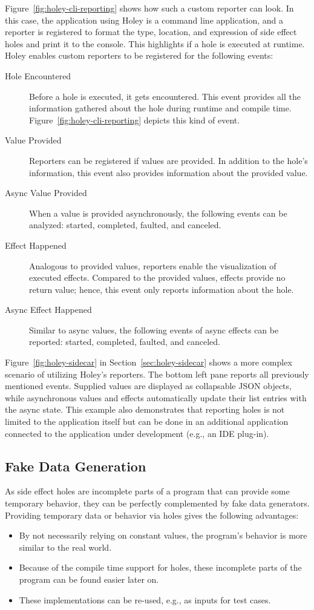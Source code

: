 Figure~\ref{fig:holey-cli-reporting} shows how such a custom reporter can look.
In this case, the application using Holey is a command line application, and a reporter is registered to format the type, location, and expression of side effect holes and print it to the console.
This highlights if a hole is executed at runtime.
Holey enables custom reporters to be registered for the following events:
\begin{description}
    \item[Hole Encountered] Before a hole is executed, it gets encountered. This event provides all the information gathered about the hole during runtime and compile time. Figure~\ref{fig:holey-cli-reporting} depicts this kind of event.
    \item[Value Provided] Reporters can be registered if values are provided. In addition to the hole's information, this event also provides information about the provided value.
    \item[Async Value Provided] When a value is provided asynchronously, the following events can be analyzed: started, completed, faulted, and canceled.
    \item[Effect Happened] Analogous to provided values, reporters enable the visualization of executed effects. Compared to the provided values, effects provide no return value; hence, this event only reports information about the hole.
    \item[Async Effect Happened] Similar to async values, the following events of async effects can be reported: started, completed, faulted, and canceled.
\end{description}
Figure~\ref{fig:holey-sidecar} in Section~\ref{sec:holey-sidecar} shows a more complex scenario of utilizing Holey's reporters.
The bottom left pane reports all previously mentioned events.
Supplied values are displayed as collapsable JSON objects, while asynchronous values and effects automatically update their list entries with the async state.
This example also demonstrates that reporting holes is not limited to the application itself but can be done in an additional application connected to the application under development (e.g., an IDE plug-in).

\subsection{Fake Data Generation}
\label{sec:holey-fake-data-generation}
As side effect holes are incomplete parts of a program that can provide some temporary behavior, they can be perfectly complemented by fake data generators.
Providing temporary data or behavior via holes gives the following advantages:
\begin{itemize}
    \item By not necessarily relying on constant values, the program's behavior is more similar to the real world.
    \item Because of the compile time support for holes, these incomplete parts of the program can be found easier later on.
    \item These implementations can be re-used, e.g., as inputs for test cases.
\end{itemize}

